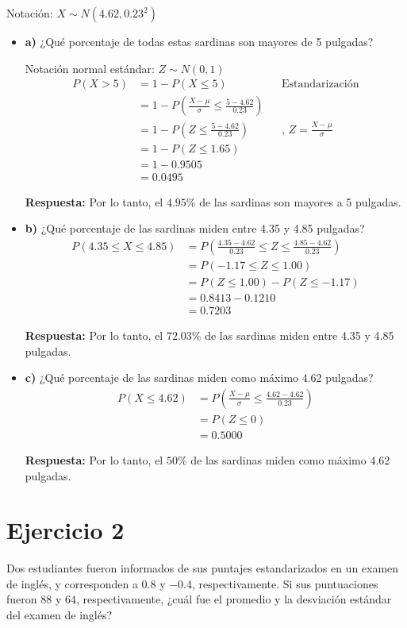 \documentclass{templateNote}
\begin{document}
Notación: $X \sim N(4.62, 0.23^2)$
\begin{itemize}
  \item \textbf{a)} ¿Qué porcentaje de todas estas sardinas son mayores de 5 pulgadas?
  
  Notación normal estándar: $Z \sim N(0, 1)$
  \begin{align*}
    P(X > 5) &= 1 - P(X \leq 5) && \text{Estandarización}\\
    &= 1 - P\left(\frac{X - \mu}{\sigma} \leq \frac{5 - 4.62}{0.23}\right) \\
    &= 1 - P\left(Z \leq \frac{5 - 4.62}{0.23}\right) && \text{, } Z = \frac{X - \mu}{\sigma} \\
    &= 1 - P(Z \leq 1.65) \\
    &= 1 - 0.9505 \\
    &= 0.0495
  \end{align*}
  
  \textbf{Respuesta:} Por lo tanto, el $4.95\%$ de las sardinas son mayores a 5 pulgadas.

  \item \textbf{b)} ¿Qué porcentaje de las sardinas miden entre 4.35 y 4.85 pulgadas?
  \begin{align*}
    P(4.35 \leq X \leq 4.85) &= P\left(\frac{4.35 - 4.62}{0.23} \leq Z \leq \frac{4.85 - 4.62}{0.23}\right) \\
    &= P(-1.17 \leq Z \leq 1.00) \\
    &= P(Z \leq 1.00) - P(Z \leq -1.17) \\
    &= 0.8413 - 0.1210 \\
    &= 0.7203
  \end{align*}

  \textbf{Respuesta:} Por lo tanto, el $72.03\%$ de las sardinas miden entre 4.35 y 4.85 pulgadas.
  
  \item \textbf{c)} ¿Qué porcentaje de las sardinas miden como máximo 4.62 pulgadas?
  \begin{align*}
    P(X \leq 4.62) &= P\left(\frac{X - \mu}{\sigma} \leq \frac{4.62 - 4.62}{0.23}\right) \\
    &= P(Z \leq 0) \\
    &= 0.5000
  \end{align*}

  \textbf{Respuesta:} Por lo tanto, el $50\%$ de las sardinas miden como máximo 4.62 pulgadas.
\end{itemize}

\newpage
\section*{Ejercicio 2}
Dos estudiantes fueron informados de sus puntajes estandarizados en un examen de inglés, y corresponden a $0.8$ y $-0.4$, respectivamente. Si sus puntuaciones fueron $88$ y $64$, respectivamente, ¿cuál fue el promedio y la desviación estándar del examen de inglés?
\end{document}
